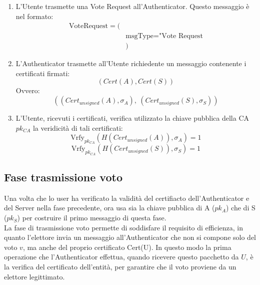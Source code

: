 \begin{figure}[H]
	\centering
	\scalebox{0.7}{}
\end{figure}

\begin{enumerate}
	\item L'Utente trasmette una Vote Request all'Authenticator. Questo messaggio è nel formato:
	$$
	\begin{aligned}
		\text{VoteRequest} = (& \\
		&\text{msgType} = \text{"Vote Request} \\
		&)
	\end{aligned}
	$$
	\item L'Authenticator trasmette all'Utente richiedente un messaggio contenente i certificati firmati: $$(Cert(A), Cert(S))$$
	Ovvero: $$((Cert_{unsigned}(A), \sigma_{A}),\ (Cert_{unsigned}(S), \sigma_{S}))$$
	\item L'Utente, ricevuti i certificati, verifica utilizzato la chiave pubblica della CA $pk_{CA}$ la veridicità di tali certificati: $$ \text{Vrfy}_{pk_{CA}}(H(Cert_{unsigned}(A)), \sigma_{A}) = 1 $$  $$ \text{Vrfy}_{pk_{CA}}(H(Cert_{unsigned}(S)), \sigma_{S}) = 1 $$
	
\end{enumerate}

\subsection{Fase trasmissione voto}

\begin{figure}[H]
	\centering
	\scalebox{0.63}{}
\end{figure}

\newpage

\begin{figure}[H]
	\centering
	\scalebox{0.63}{}
\end{figure}


	Una volta che lo user ha verificato la validità del certifiacto dell'Authenticator e del Server nella fase precedente, ora usa sia la chiave pubblica di A ($pk_{A}$) che di S ($pk_{S}$) per costruire il primo messaggio di questa fase.\\
	
	La fase di trasmissione voto permette di soddisfare il requisito di efficienza, in quanto l'elettore invia un messaggio all'Authenticator che non si compone solo del voto $v$, ma anche del proprio certificato Cert(U). In questo modo la prima operazione che l'Authenticator effettua, quando ricevere questo pacchetto da $U$, è la verifica del certificato dell'entità, per garantire che il voto proviene da un elettore legittimato.\\
	
